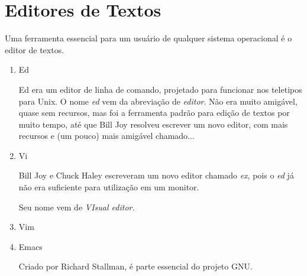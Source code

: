 

\chapter{Editores de Textos }

Uma ferramenta essencial para um usuário de qualquer sistema operacional é o
editor de textos.

\begin{enumerate}
\item{Ed}

Ed era um editor de linha de comando, projetado para funcionar nos teletipos
para Unix. O nome \emph{ed} vem da abreviação de
\emph{editor}. Não era muito amigável, quase sem recursos, mas foi a
ferramenta padrão para edição de textos por muito tempo, até que Bill Joy
resolveu escrever um novo editor, com mais recursos e (um pouco) mais
amigável chamado...

\item{Vi}

Bill Joy e Chuck Haley escreveram um novo editor chamado \emph{ex}, pois o
\emph{ed} já não era suficiente para utilização em um monitor.

Seu nome vem de \em{VIsual editor}. 

\item{Vim}

\item{Emacs}

Criado por Richard Stallman, é parte essencial do projeto GNU.
\end{enumerate}
